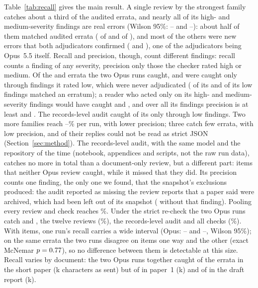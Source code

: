 \documentclass[11pt]{article}
\begin{document}
Table~\ref{tab:recall} gives the main result. A single review by the strongest family catches about a third of the audited errata,
and nearly all of its high- and medium-severity findings are real errors (Wilson 95\%: \PrecOpusALo--\PrecOpusAHi{} and
\PrecOpusBLo--\PrecOpusBHi): about half of them matched audited errata
(\PrecOpusAMatched{} of \PrecOpusAN{} and \PrecOpusBMatched{} of \PrecOpusBN), and most of the others were new errors that both
adjudicators confirmed (\PrecOpusANew{} and \PrecOpusBNew), one of the adjudicators being Opus~5.5 itself. Recall and precision, though, count
different findings: recall counts a finding of any severity, precision only those the checker rated high or medium. Of the
\RecOpusA{} and \RecOpusB{} errata the two Opus runs caught, \RecLowOnlyOpusA{} and \RecLowOnlyOpusB{} were caught only through
findings it rated low, which were never adjudicated (\NlowMatchedOpusA{} of its \NlowOpusA{} and \NlowMatchedOpusB{} of its
\NlowOpusB{} low findings matched an erratum); a reader who acted only on its high- and medium-severity findings would have caught
\RecHmOpusA{} and \RecHmOpusB{}, and over all its findings precision is at least \PrecAllOpusA{} and \PrecAllOpusB{}. The
records-level audit caught \RecLowOnlyCtwo{} of its \RecCtwo{} only through low findings. Two more families reach \MidFamLoPct--\MidFamHiPct\% per run, with lower
precision; three catch few errata, with low precision, and \NparseRecoveredWeak{} of their \NreplyWeak{} replies could not be read as
strict JSON (Section~\ref{sec:method}). The records-level audit, with the same model and the repository of the time (notebook,
appendices and scripts, not the raw run data), catches no more in total than a document-only review, but a different part: \CtwoOnlyVsOpus{} items that
neither Opus review caught, while it missed \OpusOnlyVsCtwo{} that they did. Its precision counts one finding, the only one we found, that the snapshot's
exclusions produced: the audit reported as missing the review reports that a paper said were archived, which had been left out of
its snapshot (\PrecCtwoNoExcl{} without that finding).
Pooling every review and check reaches \RecAllPct\%. Under the strict re-check the two Opus runs catch \StrictRecOpusA{}
and \StrictRecOpusB, the twelve reviews \StrictRecCone{} (\StrictRecConePct\%), the records-level audit \StrictRecCtwo{} and all checks
\StrictRecAll{} (\StrictRecAllPct\%).
With \NrefPrimary{} items, one run's recall carries a wide interval (Opus: \RecOpusALo--\RecOpusAHi{} and \RecOpusBLo--\RecOpusBHi,
Wilson 95\%); on the same errata the two runs disagree on \OpusOnlyA{} items one way and \OpusOnlyB{} the other (exact McNemar
$p=0.77$), so no difference between them is detectable at this size. Recall varies by document: the two Opus runs together caught \RecOpusEitherPshort{} of the \NprimDocPshort{} errata in the short paper
(\SizeKcPshort{}k characters as sent) but \RecOpusEitherPone{} of \NprimDocPone{} in paper~1 (\SizeKcPone{}k) and
\RecOpusEitherPsix{} of \NprimDocPsix{} in the draft report (\SizeKcPsix{}k).
\end{document}
